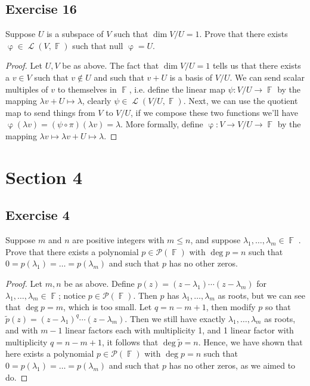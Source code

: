 \documentclass[letterpaper, 12pt]{amsart}
\DeclareMathOperator{\F}{\mathbb{F}}				%
\DeclareMathOperator{\Ell}{\mathscr{L}}				%
\DeclareMathOperator{\ph}{\varphi}					%
\renewcommand{\null}{\text{null }}					%
\theoremstyle{definition}  							%
\begin{document}
		\subsection*{Exercise 16}
		Suppose $U$ is a subspace of $V$ such that $\dim V/U = 1$. 
		Prove that there exists $\ph \in \Ell(V, \F)$ such that $\null \ph = U$.

		\begin{proof}
		Let $U,V$ be as above.
		The fact that $\dim V/U = 1$ tells us that there exists a $v \in V$ such that $v \notin U$ and such that $v + U$ is a basis of $V/U$.
		We can send scalar multiples of $v$ to themselves in $\F$, i.e. define the linear map $\psi : V/U \to \F$ by the mapping $\lambda v + U \mapsto \lambda$, clearly $\psi \in \Ell(V/U,\F)$.
		Next, we can use the quotient map to send things from $V$ to $V/U$, if we compose these two functions we'll have $\ph(\lambda v) = (\psi \circ \pi)(\lambda v) = \lambda$.
		More formally, define $\ph : V \to V/U \to \F$ by the mapping $\lambda v \mapsto \lambda v + U \mapsto \lambda$. 
		\end{proof}

	\section*{Section 4}
		\subsection*{Exercise 4}
		Suppose $m$ and $n$ are positive integers with $m \leq n$, and suppose $\lambda_{1}, \dots, \lambda_{m} \in \F$􏰃. 
		Prove that there exists a polynomial $p \in \mathcal{P}(\F)$ with $\deg p = n$ such that $0 = p(\lambda_{1}) = \dots = p(\lambda_{m})$ and such that $p$ has no other zeros.

		\begin{proof}
		Let $m,n$ be as above.
		Define $p(z) = (z - \lambda_{1}) \cdots (z - \lambda_{m})$ for $\lambda_{1}, \dots, \lambda_{m} \in \F$; notice $p \in \mathcal{P}(\F)$.
		Then $p$ has $\lambda_{1}, \dots, \lambda_{m}$ as roots, but we can see that $\deg p = m$, which is too small.
		Let $q = n-m+1$, then modify $p$ so that $\tilde{p}(z) = (z - \lambda_{1})^{q} \cdots (z - \lambda_{m})$.
		Then we still have exactly $\lambda_{1}, \dots, \lambda_{m}$ as roots, and with $m-1$ linear factors each with multiplicity 1, and 1 linear factor with multiplicity $q = n-m+1$, it follows that $\deg \tilde{p} = n$.
		Hence, we have shown that here exists a polynomial $p \in \mathcal{P}(\F)$ with $\deg p = n$ such that $0 = p(\lambda_{1}) = \dots = p(\lambda_{m})$ and such that $p$ has no other zeros, as we aimed to do.
		\end{proof}
\end{document}
